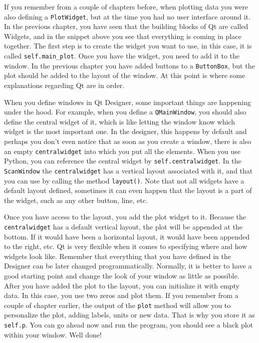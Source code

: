 If you remember from a couple of chapters before, when plotting data you
were also defining a \texttt{PlotWidget}, but at the time you had no
user interface around it. In the previous chapter, you have seen that
the building blocks of Qt are called Widgets, and in the snippet above
you see that everything is coming in place together. The first step is
to create the widget you want to use, in this case, it is called
\texttt{self.main_plot}. Once you have the widget, you need to add it
to the window. In the previous chapter you have added buttons to a
\texttt{ButtonBox}, but the plot should be added to the layout of the
window. At this point is where some explanations regarding Qt are
in order.

When you define windows in Qt Designer, some important things are
happening under the hood. For example, when you define a
\texttt{QMainWindow}, you should also define the central widget of it,
which is like letting the window know which widget is the most important
one. In the designer, this happens by default and perhaps you don't even
notice that as soon as you create a window, there is also an empty
\texttt{centralwidget} into which you put all the elements. When you use
Python, you can reference the central widget by
\texttt{self.centralwidget}. In the \texttt{ScanWindow} the
\texttt{centralwidget} has a vertical layout associated with it, and
that you can use by calling the method \texttt{layout()}. Note that not
all widgets have a default layout defined, sometimes it can even happen
that the layout is a part of the widget, such as any other button,
line, etc.

Once you have access to the layout, you add the plot widget to it.
Because the \texttt{centralwidget} has a default vertical layout, the
plot will be appended at the bottom. If it would have been a horizontal
layout, it would have been appended to the right, etc. Qt is very
flexible when it comes to specifying where and how widgets look like.
Remember that everything that you have defined in the Designer can be
later changed programmatically. Normally, it is better to have a good
starting point and change the look of your window as little as possible.
After you have added the plot to the layout, you can initialize it with
empty data. In this case, you use two zeros and plot them. If you
remember from a couple of chapter earlier, the output of the
\texttt{plot} method will allow you to personalize the plot, adding
labels, units or new data. That is why you store it as \texttt{self.p}.
You can go ahead now and run the program, you should see a black plot
within your window. Well done!

